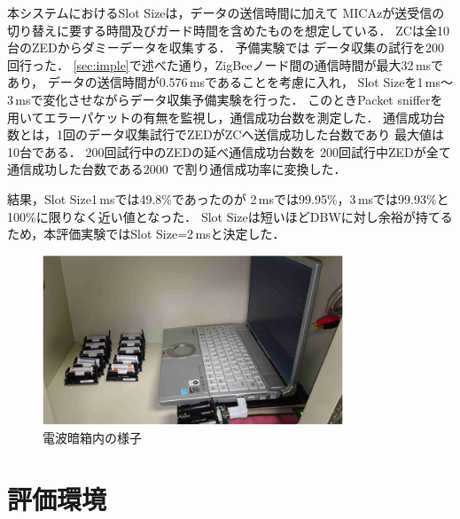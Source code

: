 \documentclass[12pt]{jreport}
\begin{document}
本システムにおけるSlot Sizeは，データの送信時間に加えて
MICAzが送受信の切り替えに要する時間及びガード時間を含めたものを想定している．
ZCは全10台のZEDからダミーデータを収集する．
予備実験では
データ収集の試行を200回行った．
\ref{sec:imple}で述べた通り，ZigBeeノード間の通信時間が最大32\,msであり，
データの送信時間が0.576\,msであることを考慮に入れ，
Slot Sizeを1\,ms〜3\,msで変化させながらデータ収集予備実験を行った．
このときPacket snifferを用いてエラーパケットの有無を監視し，通信成功台数を測定した．
通信成功台数とは，1回のデータ収集試行でZEDがZCへ送信成功した台数であり
最大値は10台である．
200回試行中のZEDの延べ通信成功台数を
200回試行中ZEDが全て通信成功した台数である2000
で割り通信成功率に変換した．

結果，Slot Size1\,msでは49.8\%であったのが
2\,msでは99.95\%，3\,msでは99.93\%と100\%に限りなく近い値となった．
Slot Sizeは短いほどDBWに対し余裕が持てる
ため，本評価実験ではSlot Size=2\,msと決定した．

\begin{figure}[bt]
 \centering
 \includegraphics[width=0.8\textwidth]{figure/nowave_box.pdf}
 \caption{電波暗箱内の様子}
 \label{fig:nowave_box}
\end{figure}

\section{評価環境}
\end{document}
